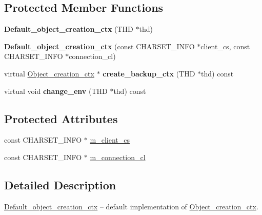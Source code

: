 \subsection*{Protected Member Functions}
\begin{DoxyCompactItemize}
\item 
\mbox{\label{classDefault__object__creation__ctx_a4396b3f7a7d8cd37547e7e27df5f323c}} 
{\bfseries Default\+\_\+object\+\_\+creation\+\_\+ctx} (T\+HD $\ast$thd)
\item 
\mbox{\label{classDefault__object__creation__ctx_a9e9f460b9114219384a0c56227b76411}} 
{\bfseries Default\+\_\+object\+\_\+creation\+\_\+ctx} (const C\+H\+A\+R\+S\+E\+T\+\_\+\+I\+N\+FO $\ast$client\+\_\+cs, const C\+H\+A\+R\+S\+E\+T\+\_\+\+I\+N\+FO $\ast$connection\+\_\+cl)
\item 
\mbox{\label{classDefault__object__creation__ctx_aab8727414334bed770ae1c9a30668b29}} 
virtual \mbox{\hyperlink{classObject__creation__ctx}{Object\+\_\+creation\+\_\+ctx}} $\ast$ {\bfseries create\+\_\+backup\+\_\+ctx} (T\+HD $\ast$thd) const
\item 
\mbox{\label{classDefault__object__creation__ctx_af18502ce8706e48668c0e0c88785a156}} 
virtual void {\bfseries change\+\_\+env} (T\+HD $\ast$thd) const
\end{DoxyCompactItemize}
\subsection*{Protected Attributes}
\begin{DoxyCompactItemize}
\item 
const C\+H\+A\+R\+S\+E\+T\+\_\+\+I\+N\+FO $\ast$ \mbox{\hyperlink{classDefault__object__creation__ctx_af69e5434f52f8465d05a7831429137b5}{m\+\_\+client\+\_\+cs}}
\item 
const C\+H\+A\+R\+S\+E\+T\+\_\+\+I\+N\+FO $\ast$ \mbox{\hyperlink{classDefault__object__creation__ctx_ac3d2574166b4be26f3a6f967e4a6ac18}{m\+\_\+connection\+\_\+cl}}
\end{DoxyCompactItemize}


\subsection{Detailed Description}
\mbox{\hyperlink{classDefault__object__creation__ctx}{Default\+\_\+object\+\_\+creation\+\_\+ctx}} -- default implementation of \mbox{\hyperlink{classObject__creation__ctx}{Object\+\_\+creation\+\_\+ctx}}. 

